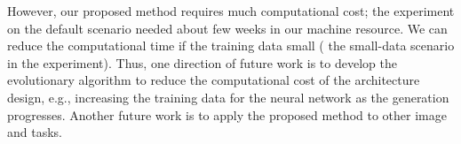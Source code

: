 However, our proposed method requires much computational cost; the experiment on the default scenario needed about  few weeks in our machine resource. We can reduce the computational time if the training data  small ( the small-data scenario in the experiment). Thus, one direction of future work is to develop the evolutionary algorithm to reduce the computational cost of the architecture design, e.g., increasing the training data for the neural network as the generation progresses. Another future work is to apply the proposed method to other image  and tasks.


